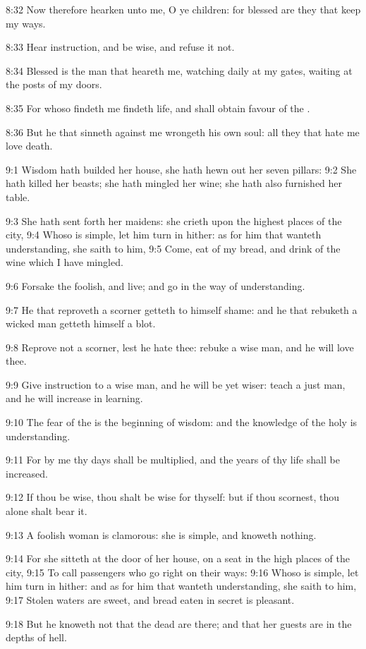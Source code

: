 8:32 Now therefore hearken unto me, O ye children: for blessed are they that keep my ways.

8:33 Hear instruction, and be wise, and refuse it not.

8:34 Blessed is the man that heareth me, watching daily at my gates, waiting at the posts of my doors.

8:35 For whoso findeth me findeth life, and shall obtain favour of the \LORD.

8:36 But he that sinneth against me wrongeth his own soul: all they that hate me love death.

9:1 Wisdom hath builded her house, she hath hewn out her seven pillars: 9:2 She hath killed her beasts; she hath mingled her wine; she hath also furnished her table.

9:3 She hath sent forth her maidens: she crieth upon the highest places of the city, 9:4 Whoso is simple, let him turn in hither: as for him that wanteth understanding, she saith to him, 9:5 Come, eat of my bread, and drink of the wine which I have mingled.

9:6 Forsake the foolish, and live; and go in the way of understanding.

9:7 He that reproveth a scorner getteth to himself shame: and he that rebuketh a wicked man getteth himself a blot.

9:8 Reprove not a scorner, lest he hate thee: rebuke a wise man, and he will love thee.

9:9 Give instruction to a wise man, and he will be yet wiser: teach a just man, and he will increase in learning.

9:10 The fear of the \LORD is the beginning of wisdom: and the knowledge of the holy is understanding.

9:11 For by me thy days shall be multiplied, and the years of thy life shall be increased.

9:12 If thou be wise, thou shalt be wise for thyself: but if thou scornest, thou alone shalt bear it.

9:13 A foolish woman is clamorous: she is simple, and knoweth nothing.

9:14 For she sitteth at the door of her house, on a seat in the high places of the city, 9:15 To call passengers who go right on their ways: 9:16 Whoso is simple, let him turn in hither: and as for him that wanteth understanding, she saith to him, 9:17 Stolen waters are sweet, and bread eaten in secret is pleasant.

9:18 But he knoweth not that the dead are there; and that her guests are in the depths of hell.

